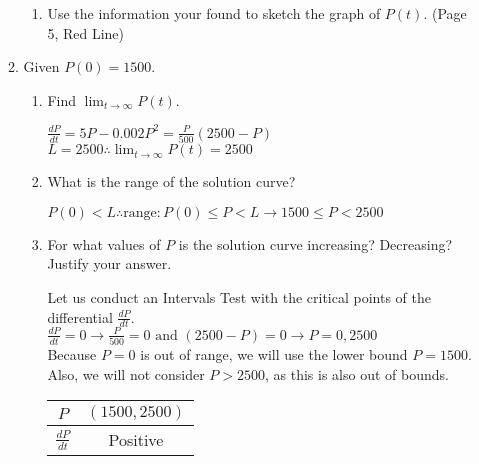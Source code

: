 \documentclass[10pt,letterpaper]{report}
\begin{document}
\begin{enumerate}
\begin{enumerate}
\begin{enumerate}
      \item{Use the information your found to sketch the graph of $P(t)$. (Page 5, Red Line)}
        
        \pagebreak
        
    \end{enumerate}
    
    \item{Given $P(0)=1500$.}
    \begin{enumerate}
      \item{Find $\lim_{t\to\infty}P(t)$. \\}
      
        $\frac{dP}{dt}=5P-0.002P^{2}=\frac{P}{500}\left(2500-P\right)$ \\
        
        $L=2500\therefore \lim_{t\to\infty}P(t)=2500$ \\
        
      \item{What is the range of the solution curve? \\}
      
        $P(0)<L\therefore \text{range}: P(0)\leq P< L\rightarrow 1500\leq P< 2500$ \\
        
      \item{For what values of $P$ is the solution curve increasing? Decreasing? Justify your answer. \\}
      
        Let us conduct an Intervals Test with the critical points of the differential $\frac{dP}{dt}$. \\
        
        $\frac{dP}{dt}=0\rightarrow \frac{P}{500}=0 \text{ and } \left(2500-P\right)=0\rightarrow P=0, 2500$ \\
        
        Because $P=0$ is out of range, we will use the lower bound $P=1500$. Also, we will not consider $P>2500$, as this is also out of bounds. 
        
        \begin{center}
          \begin{tabular}{| c | c |}
            \hline
            $P$ & $(1500, 2500)$ \\
            \hline
            $\frac{dP}{dt}$ & Positive \\
            \hline
          \end{tabular}
        \end{center} \\
        

\end{enumerate}
\end{enumerate}
\end{enumerate}
\end{document}
